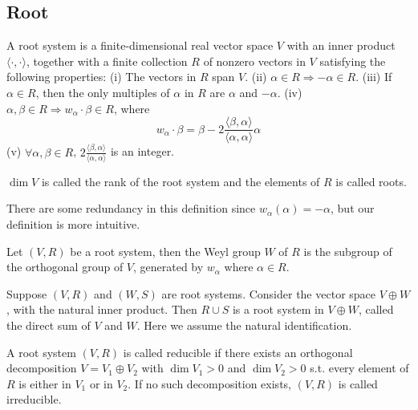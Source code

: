 \subsection{Root}
\begin{definition}
    A root system is a finite-dimensional real vector space $V$ with an inner product $\langle\cdot,\cdot\rangle$,
    together with a finite collection $R$ of nonzero vectors in $V$ satisfying the following properties:\newline 
    (i) The vectors in $R$ span $V$.\newline 
    (ii) $\alpha\in R\Longrightarrow -\alpha\in R$.\newline
    (iii) If $\alpha\in R$, then the only multiples of $\alpha$ in $R$ are $\alpha$ and $-\alpha$.\newline 
    (iv) $\alpha,\beta\in R\Longrightarrow w_\alpha\cdot \beta\in R$, where 
    \[w_\alpha\cdot \beta=\beta-2\frac{\langle\beta,\alpha\rangle}{\langle\alpha,\alpha\rangle}\alpha\]
    (v) $\forall \alpha,\beta\in R$, $2\frac{\langle\beta,\alpha\rangle}{\langle\alpha,\alpha\rangle}$ is an integer.

    $\dim V$ is called the rank of the root system and the elements of $R$ is called roots.
\end{definition}
There are some redundancy in this definition since $w_\alpha(\alpha)=-\alpha$, but our definition is more intuitive.

\begin{theorem}
    Let $(V,R)$ be a root system, then the Weyl group $W$ of $R$ is the subgroup of the orthogonal group of $V$, 
    generated by $w_\alpha$ where $\alpha\in R$.
\end{theorem}

\begin{theorem}
    Suppose $(V,R)$ and $(W,S)$ are root systems. Consider the vector space $V\oplus W$, with the natural inner product.
    Then $R\cup S$ is a root system in $V\oplus W$, called the direct sum of $V$ and $W$. Here we assume the natural identification.
\end{theorem}

\begin{definition}[Irreduciblility]
    A root system $(V,R)$ is called reducible if there exists an orthogonal decomposition $V=V_1\oplus V_2$ with $\dim V_1>0$ and $\dim V_2>0$
    s.t. every element of $R$ is either in $V_1$ or in $V_2$. If no such decomposition exists, $(V,R)$ is called irreducible.
\end{definition}

